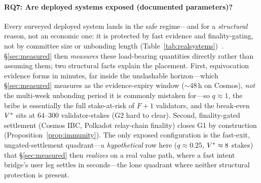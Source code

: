 \paragraph{RQ7: Are deployed systems exposed (documented parameters)?}
Every surveyed deployed system lands in the safe regime---and for a \emph{structural} reason, not an
economic one: it is protected by fast evidence and finality-gating, not by committee size or unbonding
length (Table~\ref{tab:realsystems})~\cite{harmony2019whitepaper,cosmosdocs,ethconsensusspecs,multiversxdocs,polkadotwiki,zilliqadocs}.
\S\ref{sec:measured} then \emph{measures} these load-bearing quantities directly rather than assuming
them; two structural facts explain the placement. First,
equivocation evidence forms in minutes, far inside the unslashable horizon---which \S\ref{sec:measured}
measures as the evidence-expiry window (${\sim}48$\,h on Cosmos), \emph{not} the multi-week unbonding
period it is commonly mistaken for---so $q\approx1$, the bribe is essentially the full stake-at-risk of
$F{+}1$ validators, and the break-even $V^{*}$ sits at $64$--$300$ validator-stakes (G2 hard to
clear). Second, finality-gated settlement (Cosmos IBC, Polkadot relay-chain finality) closes G1 by
construction (Proposition~\ref{prop:immunity}). The only exposed configuration is the fast-exit,
ungated-settlement quadrant---a \emph{hypothetical} row here ($q\approx0.25$, $V^{*}\approx8$
stakes) that \S\ref{sec:measured} then \emph{realizes} on a real value path, where a fast intent
bridge's user leg settles in seconds---the lone quadrant where neither structural protection is present.

\begin{table}[t]
\centering
\caption{RQ7. The model at documented parameters of named systems (approximate public figures as of
2026). $N$ is the committee size (per-shard committee for sharded rows; validator/finality-committee
size otherwise), distinct from the measurement sample size $n_{\mathrm{obs}}$ of
Table~\ref{tab:measured}. $V^{*}$ is in multiples of one validator's stake-at-risk. \emph{Window (G1)}
is the settlement-gate state (\gated/\openg/\dependsg); \emph{Verdict} is the outcome: \immune\ (G1
closed by construction), \hardgate\ ($q\!\approx\!1$, so G2 is hard to clear), or \exposed. Cosmos~Hub
and Ethereum~PoS are non-sharded accountable-BFT comparators; the fast-exit row is a labelled
\emph{hypothetical}.}
\label{tab:realsystems}
\small

\end{table}

